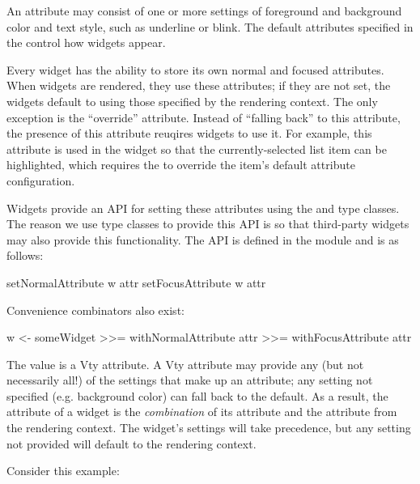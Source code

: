 An attribute may consist of one or more settings of foreground and
background color and text style, such as underline or blink.  The
default attributes specified in the  control how
widgets appear.

Every widget has the ability to store its own normal and focused
attributes.  When widgets are rendered, they use these attributes; if
they are not set, the widgets default to using those specified by the
rendering context.  The only exception is the ``override'' attribute.
Instead of ``falling back'' to this attribute, the presence of this
attribute reuqires widgets to use it.  For example, this attribute is
used in the  widget so that the currently-selected list item
can be highlighted, which requires the  to override the
item's default attribute configuration.

Widgets provide an API for setting these attributes using the
 and  type classes.  The
reason we use type classes to provide this API is so that third-party
widgets may also provide this functionality.  The API is defined in
the  module and is as follows:

\begin{haskellcode}
 setNormalAttribute w attr
 setFocusAttribute w attr
\end{haskellcode}

Convenience combinators also exist:

\begin{haskellcode}
 w <- someWidget
      >>= withNormalAttribute attr
      >>= withFocusAttribute attr
\end{haskellcode}

The  value is a Vty attribute.  A Vty attribute may provide
any (but not necessarily all!) of the settings that make up an
attribute; any setting not specified (e.g. background color) can fall
back to the default.  As a result, the attribute of a widget is the
\textit{combination} of its attribute and the attribute from the
rendering context.  The widget's settings will take precedence, but
any setting not provided will default to the rendering context.

Consider this example:


